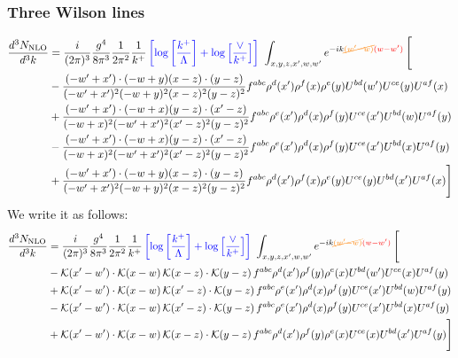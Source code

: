 \documentclass[aps,prd,amsmath,amssymb,nofootinbib]{revtex4-2}
\numberwithin{equation}{section}
\begin{document}
\subsubsection{Three Wilson lines}
\begin{align}
      \frac{d^{3}N_{\rm NLO}}{d^{3}k} & = \frac{i}{(2\pi)^{3}}\frac{g^{4}}{8\pi^{3}}\frac{1}{2\pi^{2}} \frac{1}{k^{+}}\,{\color{blue}\left[\log{\left[\frac{k^{+}}{\Lambda}\right]}+\log{\left[\frac{\vee}{k^{+}}\right]}\right]}\,\,\int_{x,y,z,x^{\prime},w,w^{\prime}}e^{-ik{\color{orange}\cancel{(w^{\prime}-w)}}{\color{red}(w-w^{\prime})}}\, \Bigg[\notag \\ & -  \frac{( - w' + x') \cdot ( - w + y) (x - z) \cdot (y - z)}{( - w' + x')^{2} ( - w + y)^{2} (x - z)^{2} (y - z)^{2}} f^{a b c} \rho^{d}(x') \rho^{f}(x) \rho^{e}(y) U^{bd}(w') U^{ce}(y) U^{a f}(x)\nonumber\\
    &+  \frac{( - w' + x') \cdot ( - w + x) (y - z) \cdot (x' - z)}{( - w + x)^{2} ( - w' + x')^{2} (x' - z)^{2} (y - z)^{2}} f^{a b c} \rho^{e}(x') \rho^{d}(x) \rho^{f}(y) U^{ce}(x') U^{bd}(w) U^{a f}(y)\nonumber\\
    &- \frac{( - w' + x') \cdot ( - w + x) (y - z) \cdot (x' - z)}{( - w + x)^{2} ( - w' + x')^{2} (x' - z)^{2} (y - z)^{2}} f^{a b c} \rho^{e}(x') \rho^{d}(x) \rho^{f}(y) U^{ce}(x') U^{b d}(x) U^{a f}(y)\nonumber\\
    &+  \frac{( - w' + x') \cdot ( - w + y) (x - z) \cdot (y - z)}{( - w' + x')^{2} ( - w + y)^{2} (x - z)^{2} (y - z)^{2}} f^{a b c} \rho^{d}(x') \rho^{f}(x) \rho^{e}(y) U^{ce}(y) U^{b d}(x') U^{a f}(x) \Bigg]
\end{align}
We write it as follows:
\begin{align}
      \frac{d^{3}N_{\rm NLO}}{d^{3}k} & = \frac{i}{(2\pi)^{3}}\frac{g^{4}}{8\pi^{3}}\frac{1}{2\pi^{2}} \frac{1}{k^{+}}\,{\color{blue}\left[\log{\left[\frac{k^{+}}{\Lambda}\right]}+\log{\left[\frac{\vee}{k^{+}}\right]}\right]}\,\,\int_{x,y,z,x^{\prime},w,w^{\prime}}e^{-ik{\color{orange}\cancel{(w^{\prime}-w)}}{\color{red}(w-w^{\prime})}}\, \Bigg[\notag \\ & - \mathcal{K}(x'-w')\cdot \mathcal{K}(x-w)\, \mathcal{K}(x-z)\cdot \mathcal{K}(y-z)\, f^{a b c} \rho^{d}(x') \rho^{f}(y) \rho^{e}(x) U^{bd}(w') U^{ce}(x) U^{a f}(y)\nonumber\\
    &+ \mathcal{K}(x'-w')\cdot \mathcal{K}(x-w)\,\mathcal{K}(x'-z)\cdot \mathcal{K}(y-z)\, f^{a b c} \rho^{e}(x') \rho^{d}(x) \rho^{f}(y) U^{ce}(x') U^{bd}(w) U^{a f}(y)\nonumber\\
    &- \mathcal{K}(x'-w')\cdot \mathcal{K}(x-w)\,\mathcal{K}(x'-z)\cdot \mathcal{K}(y-z)\, f^{a b c} \rho^{e}(x') \rho^{d}(x) \rho^{f}(y) U^{ce}(x') U^{b d}(x) U^{a f}(y)\nonumber\\
    &+  \mathcal{K}(x'-w')\cdot \mathcal{K}(x-w)\, \mathcal{K}(x-z)\cdot \mathcal{K}(y-z)\, f^{a b c} \rho^{d}(x') \rho^{f}(y) \rho^{e}(x) U^{ce}(x) U^{b d}(x') U^{a f}(y) \Bigg]
\end{align}
\end{document}
